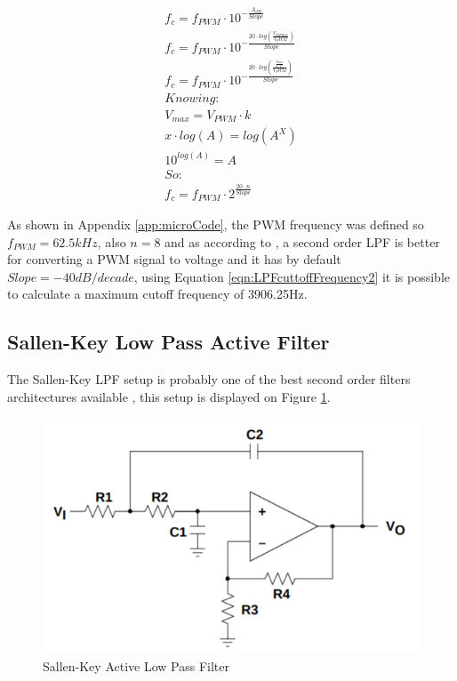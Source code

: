 			

			\begin{equation}\label{eqn:LPFcuttoffFrequency2}
				\begin{split}
					f_{c}=f_{PWM} \cdot 10^{-\frac{A_{dB}}{Slope}}	\\
					f_{c}=f_{PWM} \cdot 10^{-\frac{20\cdot log \left( \frac{V_{RIPPLE}}{V_PWM} \right)}{Slope}}	\\
					f_{c}=f_{PWM} \cdot 10^{-\frac{20\cdot log \left( \frac{\frac{V_{max}}{k \cdot 2^{n}}}{V_PWM} \right)}{Slope}}	\\
					Knowing:	\\
					V_{max}=V_{PWM} \cdot k	\\ x \cdot log \left( A \right) =  log \left( A^{X} \right) \\
					10^{log \left( A \right) } = A	\\
					So:	\\
					f_{c}=f_{PWM} \cdot  2^{\frac{20 \cdot n}{Slope}}
				\end{split}
			\end{equation}

	
		As shown in Appendix \ref{app:microCode}, the PWM frequency was defined so $f_{PWM}=62.5kHz$, also $n=8$ and as according to \cite{metivier2013pwm}, a second order LPF is better for converting a PWM signal to voltage and it has by default $Slope=-40dB/decade$, using Equation \ref{eqn:LPFcuttoffFrequency2} it is possible to calculate a maximum cutoff frequency of 3906.25Hz. 

	\subsection{Sallen-Key Low Pass Active Filter}
	
		The Sallen-Key LPF setup is probably one of the best second order filters architectures available \cite{dorfSvodoba2014}, this setup is displayed on Figure \ref{fig:sallenKeyLPF}.

		\begin{figure}[htbp]
			\centering
				\includegraphics[scale=0.6]{figuras/fig-sallenKeyLPF}
			\caption{Sallen-Key Active Low Pass Filter \cite{texas1999sallenkey}}
			\label{fig:sallenKeyLPF}
		\end{figure}

